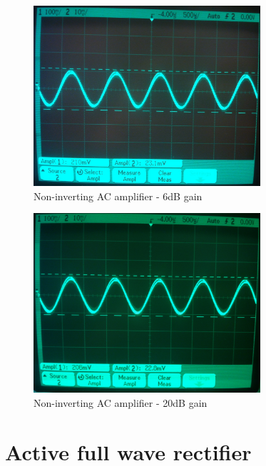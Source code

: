 \documentclass[11pt,a4paper]{article}
\begin{document}
\begin{figure}[htbp]
    \centering
    \includegraphics[width=0.75\textwidth]{img/noninvACamp-x1.jpg}
    \caption{Non-inverting AC amplifier - 6dB gain}
    \label{fig:noninvACamp-x1_scope}
\end{figure}

\begin{figure}[htbp]
    \centering
    \includegraphics[width=0.75\textwidth]{img/noninvACamp-x10.jpg}
    \caption{Non-inverting AC amplifier - 20dB gain}
    \label{fig:noninvACamp-x10_scope}
\end{figure}



\section{Active full wave rectifier}\label{active-full-wave-rectifier}
\end{document}
